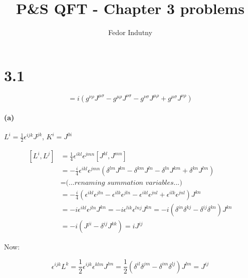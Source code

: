 \documentclass[11pt]{article}
\title{P\&S QFT - Chapter 3 problems}
\author{Fedor Indutny}
\begin{document}
\maketitle

\section*{3.1}

\begin{equation}
[ J^{\mu\nu}, J^{\rho\sigma} ] = i \left(
  g^{\nu\rho} J^{\mu\sigma} - g^{\mu\rho} J^{\nu\sigma} -
  g^{\nu\sigma} J^{\mu\rho} + g^{\mu\sigma} J^{\nu\rho}
\right)
\end{equation}

\paragraph*{(a)}

\begin{center}
$L^i = \frac{1}{2} \epsilon^{ijk} J^{jk}$, $K^i = J^{0i}$
\end{center}

\begin{equation}
\begin{split}
[ L^i, L^j ] & =
  \frac{1}{4} \epsilon^{ikl} \epsilon^{jmn} [ J^{kl}, J^{mn} ] \\
  & = -\frac{i}{4} \epsilon^{ikl} \epsilon^{jmn} \left(
    \delta^{lm} J^{kn} - \delta^{km} J^{ln} -
    \delta^{ln} J^{km} + \delta^{kn} J^{lm}
  \right) \\
  & = \textit{(...renaming summation variables...)} \\
  & = -\frac{i}{4} \left(
    \epsilon^{ikl} \epsilon^{jln} -
    \epsilon^{ilk} \epsilon^{jln} -
    \epsilon^{ikl} \epsilon^{jnl} +
    \epsilon^{ilk} \epsilon^{jnl}
  \right) J^{kn} \\
  & = -i \epsilon^{ikl} \epsilon^{jln} J^{kn} =
  -i \epsilon^{lik} \epsilon^{lnj} J^{kn} =
  -i \left( \delta^{in} \delta^{kj} - \delta^{ij} \delta^{kn} \right)
    J^{kn} \\
  & = -i \left( J^{ji} - \delta^{ij} J^{kk} \right) =
    i J^{ij}
\end{split}
\end{equation}

Now:

\begin{equation}
\epsilon^{ijk} L^k =
  \frac{1}{2} \epsilon^{ijk} \epsilon^{klm} J^{lm} =
  \frac{1}{2} \left(
    \delta^{il} \delta^{jm} - \delta^{im} \delta^{lj}
  \right) J^{lm} = J^{ij}
\end{equation}
\end{document}
